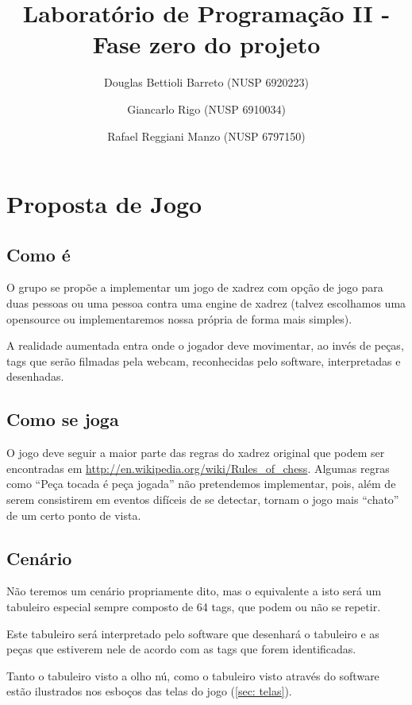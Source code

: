 \documentclass[a4paper,12pt]{article}
\title{Laborat\'orio de Programa\c c\~ao II - Fase zero do projeto}
\author{
		Douglas Bettioli Barreto (NUSP 6920223)
		\and Giancarlo Rigo (NUSP 6910034)
		\and Rafael Reggiani Manzo (NUSP 6797150)
	   }
\begin{document}
\maketitle

\section{Proposta de Jogo}
\subsection{Como \'e}
\label{sec: comoeojogo}

O grupo se prop\~oe a implementar um jogo de xadrez com op\c c\~ao de jogo para
duas pessoas ou uma pessoa contra uma engine de xadrez (talvez escolhamos uma
opensource ou implementaremos nossa pr\'opria de forma mais simples).

A realidade aumentada entra onde o jogador deve movimentar, ao inv\'es de pe\c
cas, tags que ser\~ao filmadas pela webcam, reconhecidas pelo software,
interpretadas e desenhadas.

\subsection{Como se joga}
\label{sec: comosejoga}

O jogo deve seguir a maior parte das regras do xadrez original que podem ser
encontradas em \url{http://en.wikipedia.org/wiki/Rules_of_chess}. Algumas
regras como ``Pe\c ca tocada \'e pe\c ca jogada'' n\~ao pretendemos
implementar, pois, al\'em de serem consistirem em eventos dif\'iceis de se
detectar, tornam o jogo mais ``chato'' de um certo ponto de vista.

\subsection{Cen\'ario}
\label{sec: cenario}

N\~ao teremos um cen\'ario propriamente dito, mas o equivalente a isto ser\'a um
tabuleiro especial sempre composto de 64 tags, que podem ou n\~ao se repetir.

Este tabuleiro ser\'a interpretado pelo software que desenhar\'a o tabuleiro e
as pe\c cas que estiverem nele de acordo com as tags que forem identificadas.

Tanto o tabuleiro visto a olho n\'u, como o tabuleiro visto atrav\'es do
software est\~ao ilustrados nos esbo\c cos das telas do jogo (\ref{sec: telas}).
\end{document}
